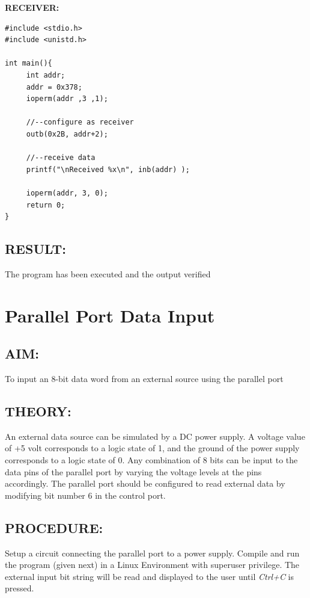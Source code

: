 \documentclass[a4paper,28pt,twoside,openright]{report}
\begin{document}
\vspace{20pt}
\textbf{RECEIVER:}
\begin{lstlisting}
#include <stdio.h>
#include <unistd.h>

int main(){
     int addr;
     addr = 0x378;
     ioperm(addr ,3 ,1);
     
     //--configure as receiver
     outb(0x2B, addr+2);
     
     //--receive data
     printf("\nReceived %x\n", inb(addr) );
     
     ioperm(addr, 3, 0);
     return 0;
}
\end{lstlisting}

\section*{RESULT:}
The program has been executed and the output verified
%
%
%
%
\chapter{Parallel Port Data Input}
%
%
\section*{AIM:}
To input an 8-bit data word from an external source using the parallel port
\section*{THEORY:}
An external data source can be simulated by a DC power supply. A voltage value of +5 volt corresponds to a logic state of 1, and the ground of the power supply corresponds to a logic state of 0. Any combination of 8
bits can be input to the data pins of the parallel port by varying the voltage levels at the pins accordingly. The parallel port should be configured to read external data by modifying bit number 6 in the control port.
\section*{PROCEDURE:}
Setup a circuit connecting the parallel port to a power supply. Compile and run the program (given next) in a Linux Environment with superuser privilege. The external input bit string will be read and displayed to the user until \emph{Ctrl+C} is pressed.
\end{document}
